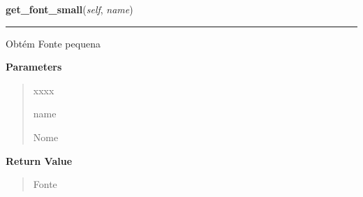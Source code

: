 \hspace{.8\funcindent}\begin{boxedminipage}{\funcwidth}

    \raggedright \textbf{get\_font\_small}(\textit{self}, \textit{name})

    \vspace{-1.5ex}

    \rule{\textwidth}{0.5\fboxrule}
\setlength{\parskip}{2ex}
    Obtém Fonte pequena

\setlength{\parskip}{1ex}
      \textbf{Parameters}
      \vspace{-1ex}

      \begin{quote}
        \begin{Ventry}{xxxx}

          \item[name]

          Nome

        \end{Ventry}

      \end{quote}

      \textbf{Return Value}
    \vspace{-1ex}

      \begin{quote}
      Fonte

      \end{quote}

    \end{boxedminipage}

    \label{pygame-asteroids:resource_manager:ResourceManager:get_font_very_small}

    \vspace{0.5ex}

